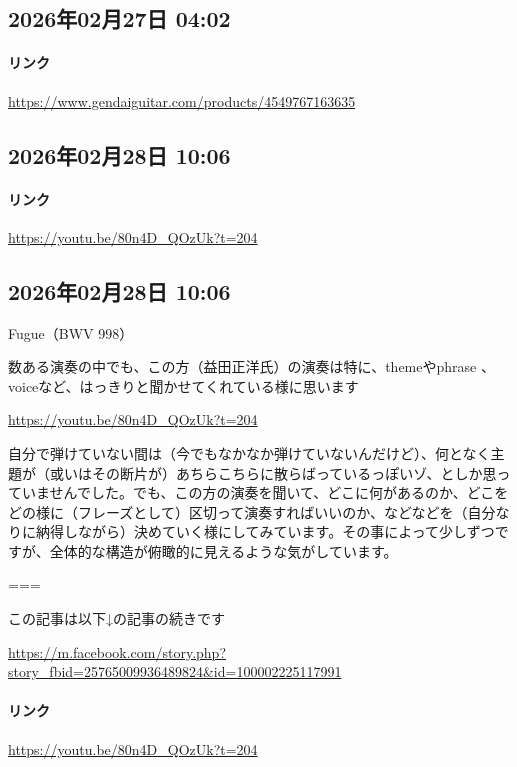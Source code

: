 \subsection*{2026年02月27日 04:02}

\paragraph{リンク}
\url{https://www.gendaiguitar.com/products/4549767163635}

\subsection*{2026年02月28日 10:06}

\paragraph{リンク}
\url{https://youtu.be/80n4D_QOzUk?t=204}

\subsection*{2026年02月28日 10:06}

Fugue（BWV 998）

数ある演奏の中でも、この方（益田正洋氏）の演奏は特に、themeやphrase 、voiceなど、はっきりと聞かせてくれている様に思います

\url{https://youtu.be/80n4D_QOzUk?t=204}

自分で弾けていない間は（今でもなかなか弾けていないんだけど）、何となく主題が（或いはその断片が）あちらこちらに散らばっているっぽいゾ、としか思っていませんでした。でも、この方の演奏を聞いて、どこに何があるのか、どこをどの様に（フレーズとして）区切って演奏すればいいのか、などなどを（自分なりに納得しながら）決めていく様にしてみています。その事によって少しずつですが、全体的な構造が俯瞰的に見えるような気がしています。

===

この記事は以下↓の記事の続きです

\url{https://m.facebook.com/story.php?story_fbid=25765009936489824&id=100002225117991}

\paragraph{リンク}
\url{https://youtu.be/80n4D_QOzUk?t=204}

